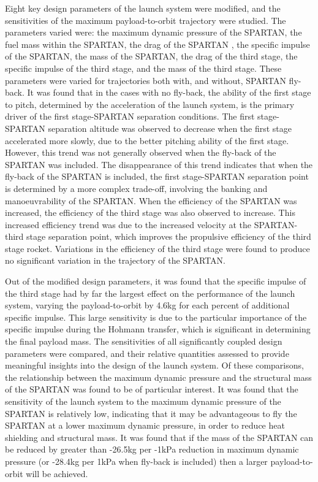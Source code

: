 Eight key design parameters of the launch system were modified, and the sensitivities of the maximum payload-to-orbit trajectory were studied.
The parameters varied were: the maximum dynamic pressure of the SPARTAN, the fuel mass within the SPARTAN, the drag of the SPARTAN , the specific impulse of the SPARTAN, the mass of the SPARTAN, the drag of the third stage, the specific impulse of the third stage, and the mass of the third stage. 
These parameters were varied for trajectories both with, and without, SPARTAN fly-back. 
It was found that in the cases with no fly-back, the ability of the first stage to pitch, determined by the acceleration of the launch system, is the primary driver of the first stage-SPARTAN separation conditions. The first stage-SPARTAN separation altitude was observed to decrease when the first stage accelerated more slowly, due to the better pitching ability of the first stage. However, this trend was not generally observed when the fly-back of the SPARTAN was included. The disappearance of this trend indicates that when the fly-back of the SPARTAN is included, the first stage-SPARTAN separation point is determined by a more complex trade-off, involving the banking and manoeuvrability of the SPARTAN. 
When the efficiency of the SPARTAN was increased, the efficiency of the third stage was also observed to increase. This increased efficiency trend was due to the increased velocity at the SPARTAN-third stage separation point, which improves the propulsive efficiency of the third stage rocket. 
Variations in the efficiency of the third stage were found to produce no significant variation in the trajectory of the SPARTAN. 

Out of the modified design parameters, it was found that the specific impulse of the third stage had by far the largest effect on the performance of the launch system, varying the payload-to-orbit by 4.6kg for each percent of additional specific impulse. This large sensitivity is due to the particular importance of the specific impulse during the Hohmann transfer, which is significant in determining the final payload mass. 
The sensitivities of all significantly coupled design parameters were compared, and their relative quantities assessed to provide meaningful insights into the design of the launch system. Of these comparisons, the relationship between the maximum dynamic pressure and the structural mass of the SPARTAN was found to be of particular interest. 
It was found that the sensitivity of the launch system to the maximum dynamic pressure of the SPARTAN is relatively low, indicating that it may be advantageous to fly the SPARTAN at a lower maximum dynamic pressure, in order to reduce heat shielding and structural mass. It was found that if the mass of the SPARTAN can be reduced by greater than -26.5kg per -1kPa reduction in maximum dynamic pressure (or -28.4kg per 1kPa when fly-back is included) then a larger payload-to-orbit will be achieved.
 

